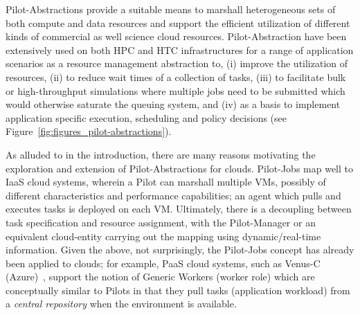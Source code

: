 \documentclass[times]{cpeauth}
\newcommand{\jhanote}[1]{ {\textcolor{red} { ***shantenu: #1 }}}
\newcommand{\alnote}[1]{ {\textcolor{green} { ***andreL: #1 }}}
\newcommand{\alnote}[1]{}
\newcommand{\jhanote}[1]{}
\newcommand{\pilot}{Pilot\xspace}
\newcommand{\pilots}{Pilots\xspace}
\newcommand{\pilotjobs}{Pilot-Jobs\xspace}
\newcommand{\pilotmapreduce}{PilotMapReduce\xspace}
\begin{document}

\pilot-Abstractions provide a suitable means to marshall heterogeneous
sets of both compute and data resources and support the efficient
utilization of different kinds of commercial as well science cloud
resources.  \pilot-Abstraction have been extensively used on both HPC
and HTC infrastructures for a range of application scenarios as a
resource management abstraction to, (i) improve the utilization of
resources, (ii) to reduce wait times of a collection of tasks, (iii)
to facilitate bulk or high-throughput simulations where multiple jobs
need to be submitted which would otherwise saturate the queuing
system, and (iv) as a basis to implement application specific
execution, scheduling and policy decisions (see
Figure~\ref{fig:figures_pilot-abstractions}).
 

As alluded to in the introduction, there are many reasons motivating
the exploration and extension of \pilot-Abstractions for clouds.
\pilotjobs map well to IaaS cloud systems, wherein a \pilot can
marshall multiple VMs, possibly of different characteristics and
performance capabilities; an agent which pulls and executes tasks is
deployed on each VM. Ultimately, there is a decoupling between task
specification and resource assignment, with the \pilot-Manager or an
equivalent cloud-entity carrying out the mapping using
dynamic/real-time information.  Given the above, not surprisingly, the
\pilotjobs concept has already been applied to clouds; for example,
PaaS cloud systems, such as Venus-C
(Azure)~\cite{venusc-generic-worker}, support the notion of Generic
Workers (worker role) which are conceptually similar to \pilots in
that they pull tasks (application workload) from a {\it central
  repository} when the environment is available.
\end{document}
